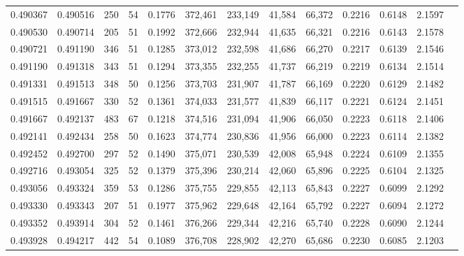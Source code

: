 \begin{tabular}{rrrrrrrrrrrrr}
0.490367 & 0.490516 &    250 &    54 &                                     0.1776 & 372,461 & 233,149 &  41,584 &  66,372 & 0.2216 & 0.6148 & 2.1597 \\
0.490530 & 0.490714 &    205 &    51 &                                     0.1992 & 372,666 & 232,944 &  41,635 &  66,321 & 0.2216 & 0.6143 & 2.1578 \\
0.490721 & 0.491190 &    346 &    51 &                                     0.1285 & 373,012 & 232,598 &  41,686 &  66,270 & 0.2217 & 0.6139 & 2.1546 \\
0.491190 & 0.491318 &    343 &    51 &                                     0.1294 & 373,355 & 232,255 &  41,737 &  66,219 & 0.2219 & 0.6134 & 2.1514 \\
0.491331 & 0.491513 &    348 &    50 &                                     0.1256 & 373,703 & 231,907 &  41,787 &  66,169 & 0.2220 & 0.6129 & 2.1482 \\
0.491515 & 0.491667 &    330 &    52 &                                     0.1361 & 374,033 & 231,577 &  41,839 &  66,117 & 0.2221 & 0.6124 & 2.1451 \\
0.491667 & 0.492137 &    483 &    67 &                                     0.1218 & 374,516 & 231,094 &  41,906 &  66,050 & 0.2223 & 0.6118 & 2.1406 \\
0.492141 & 0.492434 &    258 &    50 &                                     0.1623 & 374,774 & 230,836 &  41,956 &  66,000 & 0.2223 & 0.6114 & 2.1382 \\
0.492452 & 0.492700 &    297 &    52 &                                     0.1490 & 375,071 & 230,539 &  42,008 &  65,948 & 0.2224 & 0.6109 & 2.1355 \\
0.492716 & 0.493054 &    325 &    52 &                                     0.1379 & 375,396 & 230,214 &  42,060 &  65,896 & 0.2225 & 0.6104 & 2.1325 \\
0.493056 & 0.493324 &    359 &    53 &                                     0.1286 & 375,755 & 229,855 &  42,113 &  65,843 & 0.2227 & 0.6099 & 2.1292 \\
0.493330 & 0.493343 &    207 &    51 &                                     0.1977 & 375,962 & 229,648 &  42,164 &  65,792 & 0.2227 & 0.6094 & 2.1272 \\
0.493352 & 0.493914 &    304 &    52 &                                     0.1461 & 376,266 & 229,344 &  42,216 &  65,740 & 0.2228 & 0.6090 & 2.1244 \\
0.493928 & 0.494217 &    442 &    54 &                                     0.1089 & 376,708 & 228,902 &  42,270 &  65,686 & 0.2230 & 0.6085 & 2.1203 \\

\end{tabular}
